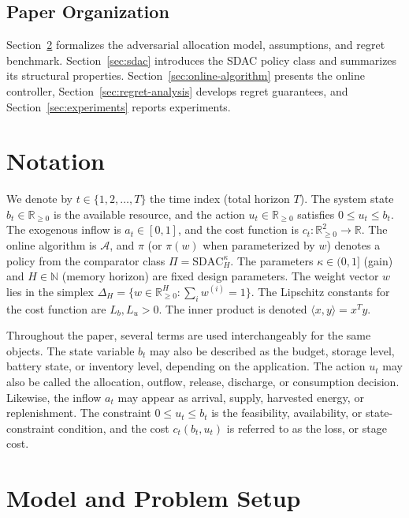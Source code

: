 \documentclass[11pt]{article}
\begin{document}
\subsection{Paper Organization}
Section~\ref{sec:model-setup} formalizes the adversarial allocation model, assumptions, and regret benchmark. Section~\ref{sec:sdac} introduces the SDAC policy class and summarizes its structural properties. Section~\ref{sec:online-algorithm} presents the online controller, Section~\ref{sec:regret-analysis} develops regret guarantees, and Section~\ref{sec:experiments} reports experiments.


\section{Notation}
\label{sec:notation}

We denote by $t\in\{1,2,\ldots,T\}$ the time index (total horizon $T$). The system state $b_t\in\mathbb{R}_{\ge 0}$ is the available resource, and the action $u_t\in\mathbb{R}_{\ge 0}$ satisfies $0 \le u_t \le b_t$. The exogenous inflow is $a_t\in[0,1]$, and the cost function is $c_t:\mathbb{R}_{\ge 0}^2\to\mathbb{R}$. The online algorithm is $\mathcal{A}$, and $\pi$ (or $\pi(w)$ when parameterized by $w$) denotes a policy from the comparator class $\Pi = \mathrm{SDAC}_H^{\kappa}$. The parameters $\kappa\in(0,1]$ (gain) and $H\in\mathbb{N}$ (memory horizon) are fixed design parameters. The weight vector $w$ lies in the simplex $\Delta_H = \{w\in\mathbb{R}_{\ge 0}^H : \sum_i w^{(i)}=1\}$. The Lipschitz constants for the cost function are $L_b,L_u>0$. The inner product is denoted $\langle x,y\rangle = x^T y$.

Throughout the paper, several terms are used interchangeably for the same objects. The state variable $b_t$ may also be described as the budget, storage level, battery state, or inventory level,  depending on the application. The action $u_t$ may also be called the allocation, outflow, release, discharge, or consumption decision. Likewise, the inflow $a_t$ may appear as arrival, supply, harvested energy, or replenishment. The constraint $0 \le u_t \le b_t$ is the feasibility, availability, or state-constraint condition, and the cost $c_t(b_t,u_t)$ is referred to as the loss, or stage cost.

\section{Model and Problem Setup}
\label{sec:model-setup}
\end{document}
